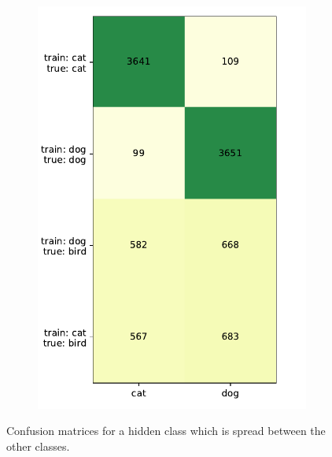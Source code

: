 \documentclass[a4paper,11pt]{scrartcl}
\theoremstyle{definition}
\begin{document}
\begin{figure}[htbp]
\begin{subfigure}[t]{0.49\textwidth}
\includegraphics[width=0.99\textwidth]{Plots_4/compound_1000_25_25_no_Title_same_scale_hidden.pdf}
\label{subfig:confusion_25_25_hidden}
\end{subfigure}
\caption[Confusion matrix hidden class.]{Confusion matrices for a hidden class which is spread between the other classes.}
\label{fig:confusion_matrix_hidden}
\end{figure}
\end{document}
